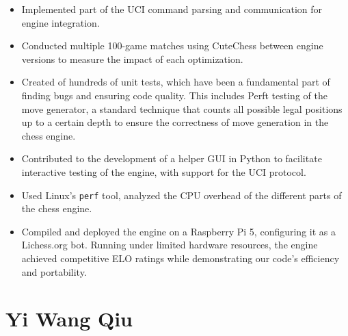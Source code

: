 \begin{itemize}[itemsep=1pt]
    \item Implemented part of the UCI command parsing and communication for engine integration.

    \item Conducted multiple 100-game matches using CuteChess between engine versions to measure the impact of each optimization.

    \item Created of hundreds of unit tests, which have been a fundamental part of finding bugs and ensuring code quality. This includes Perft testing of the move generator, a standard technique that counts all possible legal positions up to a certain depth to ensure the correctness of move generation in the chess engine.

    \item Contributed to the development of a helper GUI in Python to facilitate interactive testing of the engine, with support for the UCI protocol.    

    \item Used Linux's \texttt{perf} tool, analyzed the CPU overhead of the different parts of the chess engine.

    \item Compiled and deployed the engine on a Raspberry Pi 5, configuring it as a Lichess.org bot.  Running under limited hardware resources, the engine achieved competitive ELO ratings while demonstrating our code's efficiency and portability.

\end{itemize}

\section*{Yi Wang Qiu}

